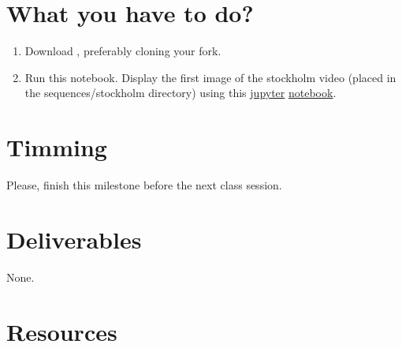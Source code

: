 \section{What you have to do?}

\begin{enumerate}
\item Download \theproject, preferably cloning your fork.
\item Run this notebook.
  Display the first image of the stockholm video (placed in the
  sequences/stockholm directory) using this
  \href{https://jupyter.org/}{jupyter} \href{}{notebook}.
\end{enumerate}

\section{Timming}

Please, finish this milestone before the next class session.

\section{Deliverables}

None.

\section{Resources}


